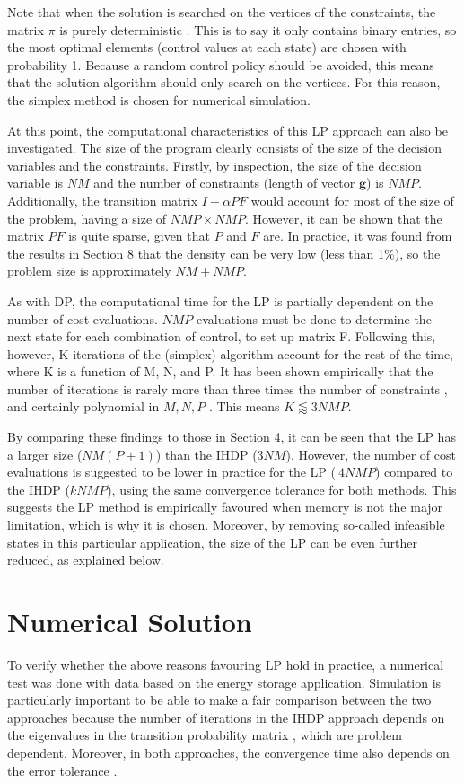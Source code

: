 \documentclass[conference]{IEEEtran}
\begin{document}
Note that when the solution is searched on the vertices of the constraints, the matrix $\pi$ is purely deterministic \cite{MDPs}. This is to say it only contains binary entries, so the most optimal elements (control values at each state) are chosen with probability 1. Because a random control policy should be avoided, this means that the solution algorithm should only search on the vertices. For this reason, the simplex method is chosen for numerical simulation.

At this point, the computational characteristics of this LP approach can also be investigated. The size of the program clearly consists of the size of the decision variables and the constraints. Firstly, by inspection, the size of the decision variable  is $NM$ and the number of constraints (length of vector $\boldsymbol{g}$) is $NMP$. Additionally, the transition matrix $I-\alpha PF$ would account for most of the size of the problem, having a size of $NMP\times NMP$. However, it can be shown that the matrix $PF$ is quite sparse, given that $P$ and $F$ are. In practice, it was found from the results in Section 8 that the density can be very low (less than 1\%), so the problem size is approximately $NM + NMP$.

As with DP, the computational time for the LP is partially dependent on the number of cost evaluations. $NMP$ evaluations must be done to determine the next state for each combination of control, to set up matrix F. Following this, however, K iterations of the (simplex) algorithm account for the rest of the time, where K is a function of M, N, and P. It has been shown empirically that the number of iterations is rarely more than three times the number of constraints \cite{bazaraa2010linear}, and certainly polynomial in $M,N,P$ \cite{doi:10.1287/moor.1110.0516}. This means $K\lessapprox3NMP$.

By comparing these findings to those in Section 4, it can be seen that the LP has a larger size ($NM(P+1)$) than the IHDP ($3NM$). However, the number of cost evaluations is suggested to be lower in practice for the LP ($~4NMP$) compared to the IHDP ($kNMP$), using the same convergence tolerance for both methods. This suggests the LP method is empirically favoured when memory is not the major limitation, which is why it is chosen. Moreover, by removing so-called infeasible states in this particular application, the size of the LP can be even further reduced, as explained below.

\section{Numerical Solution}
To verify whether the above reasons favouring LP hold in practice, a numerical test was done with data based on the energy storage application. Simulation is particularly important to be able to make a fair comparison between the two approaches because the number of iterations in the IHDP approach depends on the eigenvalues in the transition probability matrix \cite{Bertsekas:2007:DPO:1396348}, which are problem dependent. Moreover, in both approaches, the convergence time also depends on the error tolerance \cite{Bertsekas:2007:DPO:1396348}.
\end{document}
